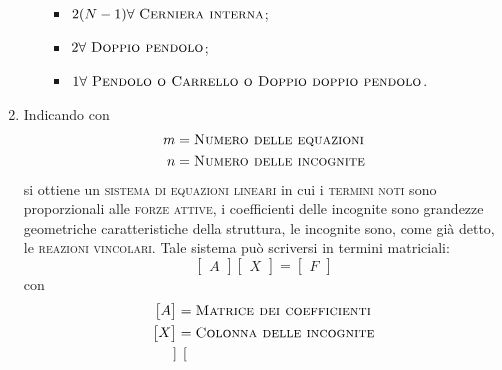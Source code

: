 \begin{enumerate}
\begin{itemize}
\begin{itemize}
\item $2(N-1)\forall\,\,\textup{\textsc{Cerniera interna}}$;
\item $2\forall\,\,\textup{\textsc{Doppio pendolo}}$;
\item $1\forall\,\,\textup{\textsc{Pendolo o Carrello o Doppio doppio pendolo}}$.
\end{itemize}
\end{itemize}
\item Indicando con 
\begin{align*}
m &= \textup{\textsc{Numero delle equazioni}} \\
n &= \textup{\textsc{Numero delle incognite}}
\end{align*}
si ottiene un \textsc{sistema di equazioni lineari} in cui i \textsc{termini noti} sono proporzionali alle \textsc{forze attive}, i coefficienti delle incognite sono grandezze geometriche caratteristiche della struttura, le incognite sono, come già detto, le \textsc{reazioni vincolari}. Tale sistema può scriversi in termini matriciali:
\begin{equation} \label{equazione7-1}
\begin{bmatrix}
A
\end{bmatrix}
\begin{bmatrix}
X
\end{bmatrix} 
=
\begin{bmatrix}
F
\end{bmatrix}
\tag{7.1}
\end{equation}
con 
\begin{align*}
\begin{bmatrix}
A
\end{bmatrix} &= \textup{\textsc{Matrice dei coefficienti}} \\
\begin{bmatrix}
X
\end{bmatrix} &= \textup{\textsc{Colonna delle incognite}} \\
\begin{bmatrix}

\end{bmatrix}
\end{align*}
\end{enumerate}
